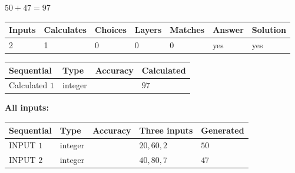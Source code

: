 \documentclass[12pt]{article}
\begin{document}
 

 
 
 
\noindent{}
 
 

$ %
50 +  %
47=   %
97$
 
 
\noindent{}
 
 

 
   
   
   
   
\noindent\begin{tabular}{|l|l|l|l|l|l|l|}
 \hline
Inputs & Calculates & Choices & Layers & Matches & Answer & Solution \\ \hline
 2  & 
 1  & 
 0
  & 
 0  & 
 0  & 
  yes & 
  yes 
  \\ \hline
 \end{tabular}
   
   
   
   
\noindent{}
   
   
  
  
\noindent\begin{tabular}{|l|l|l|l|}
\hline
 Sequential & Type & Accuracy & Calculated \\ 
\hline
 
 
  Calculated $  1 $ & integer &  & 
  $ 97 $ 
 \\  \hline  
 \end{tabular}
   
   
   
   
\noindent\vspace{0.1in}\hspace{-0.08in} {\textbf{\Large{All inputs: }}}
   
   
  
  
\noindent\begin{tabular}{|l|l|l|l|l|}
\hline
 Sequential & Type & Accuracy & Three inputs & Generated \\ 
\hline
 
 
  INPUT $  1 $ & integer &  & $
 20
 , 
 60
 , 
 2
 $ & $ 50 $ 
 \\  \hline  
 
 
  INPUT $  2 $ & integer &  & $
 40
 , 
 80
 , 
 7
 $ & $ 47 $ 
 \\  \hline  
 \end{tabular}
   
\end{document}
